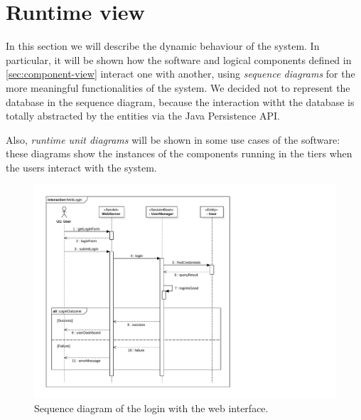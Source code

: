 \section{Runtime view}
\label{sec:runtime-view}

In this section we will describe the dynamic behaviour of the system.
In particular, it will be shown how the software and logical components defined in \autoref{sec:component-view} interact one with another, using \emph{sequence diagrams} for the more meaningful functionalities of the system.
We decided not to represent the database in the sequence diagram, because the interaction witht the database is totally abstracted by the entities via the Java Persistence API.

Also, \emph{runtime unit diagrams} will be shown in some use cases of the software: these diagrams show the instances of the components running in the tiers when the users interact with the system.

\begin{figure}[h]
    \centering
    \includegraphics[width=\textwidth]{diagrams/sequence_weblogin}
    \caption{Sequence diagram of the login with the web interface.}
    \label{fig:sequence-weblogin}
\end{figure}

